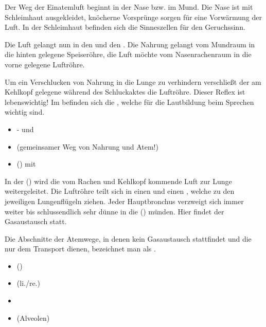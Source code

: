 {%
Der Weg der Einatemluft beginnt in der Nase bzw. im Mund. Die Nase ist
mit Schleimhaut ausgekleidet, knöcherne Vorsprünge sorgen für
eine Vorwärmung der Luft. In der Schleimhaut be\-finden sich die
Sinneszellen für den Geruchssinn. 


Die Luft gelangt nun in den  und den
.  Die Nahrung gelangt vom Mundraum in die
hinten gelegene Speiseröhre, die Luft möchte vom Nasen\-rachen\-raum in die vorne gelegene Luftröhre. 

Um ein Verschlucken von Nahrung in die Lunge zu verhindern
verschließt der am Kehlkopf gelegene 
während des Schluckaktes die Luftröhre. Dieser Reflex ist lebenswichtig! 
Im   befinden sich die ,
welche für die Lautbildung beim Sprechen wichtig sind.

}{%
\begin{itemize}
    \item {}- und   
    \item {} (gemeinsamer Weg von Nahrung und
    Atem!)  
    \item {} () mit
       
\end{itemize}
}{}{}{}

{%
\label{topic:alveolen}
In der  () wird die vom Rachen
und Kehlkopf kommende Luft zur Lunge weitergeleitet. Die Luftröhre teilt sich in einen
 und einen  ,
welche zu den jeweiligen Lungenflügeln ziehen. Jeder Hauptbronchus verzweigt sich immer weiter
bis schlussendlich sehr dünne  in die
 () münden. Hier findet
der Gasaustausch statt.

Die Abschnitte der Atemwege, in denen kein Gasaustausch
stattfindet und die nur dem Transport dienen, bezeichnet man
als {\quotedblbase}.
}{%
\begin{itemize}
    \item {}
    ()
    \item {} (li./re.)
    \item {}
    \item {}
    ({Alveolen})
\end{itemize}
}{}{}{}



